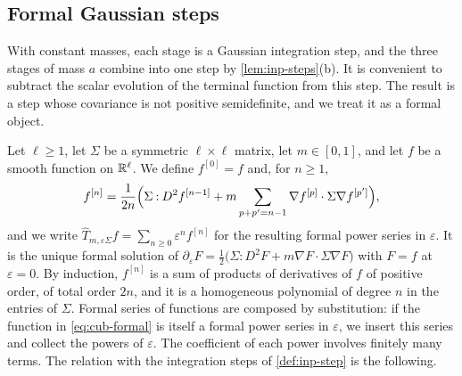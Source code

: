 \subsection{Formal Gaussian steps}

With constant masses, each stage is a Gaussian integration step, and the
three stages of mass $a$ combine into one step by \cref{lem:inp-steps}(b). It
is convenient to subtract the scalar evolution of the terminal function from
this step. The result is a step whose covariance is not positive semidefinite,
and we treat it as a formal object.

Let $\ell\ge1$, let $\Sigma$ be a symmetric $\ell\times\ell$ matrix, let
$m\in[0,1]$, and let $f$ be a smooth function on $\mathbb R^\ell$. We define $f^{[0]}=f$
and, for $n\ge1$,
\begin{equation}\label{eq:cub-formal}
 f^{[n]}=\frac1{2n}\Bigl(\Sigma\mathbin:D^2f^{[n-1]}
 +m\sum_{p+p'=n-1}\nabla f^{[p]}\cdot\Sigma\nabla f^{[p']}\Bigr),
\end{equation}
and we write $\widehat T_{m,\varepsilon\Sigma}f=\sum_{n\ge0}\varepsilon^nf^{[n]}$
for the resulting formal power series in $\varepsilon$. It is the unique formal
solution of $\partial_\varepsilon F=\frac12\bigl(\Sigma\mathbin:D^2F
+m\nabla F\cdot\Sigma\nabla F\bigr)$ with $F=f$ at $\varepsilon=0$. By induction,
$f^{[n]}$ is a sum of products of derivatives of $f$ of positive order, of
total order $2n$, and it is a homogeneous polynomial of degree $n$ in the
entries of $\Sigma$. Formal series of functions are composed by substitution:
if the function in \eqref{eq:cub-formal} is itself a formal power series in
$\varepsilon$, we insert this series and collect the powers of $\varepsilon$. The coefficient of each power involves finitely many
terms. The relation with the integration steps of \cref{def:inp-step} is the
following.

